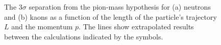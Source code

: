 \begin{figure}
\begin{center}
\end{center}
\caption{
The $3\sigma$ separation from the pion-mass hypothesis for (a) neutrons and (b) kaons as a function of the length of the particle's trajectory $L$ 
and the momentum $p$. The lines show extrapolated results between the calculations indicated by the symbols.  
}
\label{fig:singleparticles}
\end{figure}


